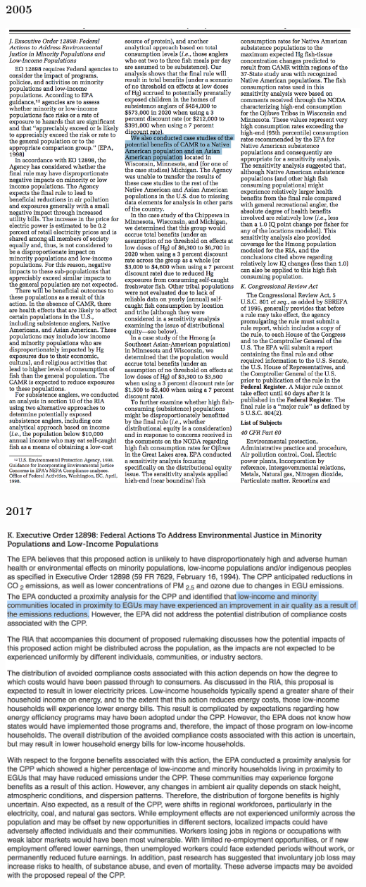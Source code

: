 \documentclass[10pt]{beamer}
\begin{document}
\begin{frame}
\frametitle{2005}
\includegraphics[width = \textwidth]{ej_murcury_final.png}
\end{frame}

\begin{frame}
\frametitle{2017}
\includegraphics[width = \textwidth]{ej_murcury_repeal.png}
\end{frame}
\end{document}
